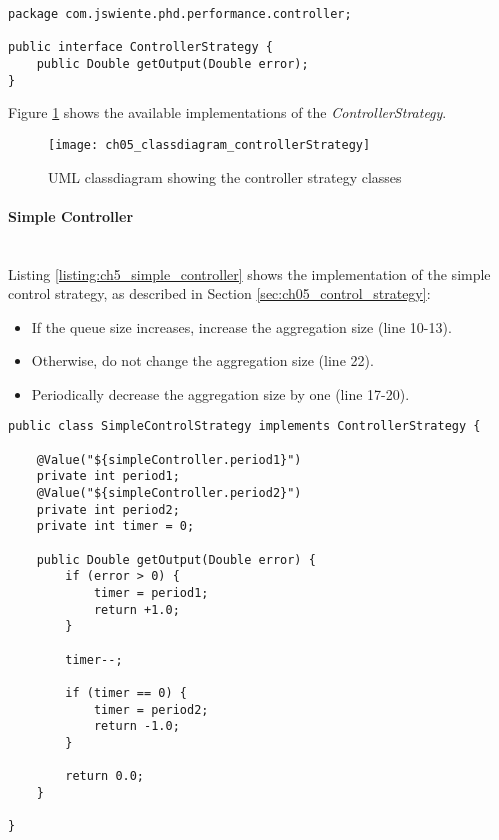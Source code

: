 \begin{lstlisting}[caption={ControllerStrategy Interface},label=listing:ch5_controller_strategy]
package com.jswiente.phd.performance.controller;

public interface ControllerStrategy {
	public Double getOutput(Double error);
}
\end{lstlisting}

Figure \ref{fig:ch05_classdiagram_controllerStrategy} shows the available implementations of the \emph{ControllerStrategy}.

\begin{figure}[htbp]
	\centering
	\texttt{[image: ch05\_classdiagram\_controllerStrategy]}
	\caption{\ac{UML} classdiagram showing the controller strategy classes}
	\label{fig:ch05_classdiagram_controllerStrategy}
\end{figure}

\paragraph{Simple Controller}\mbox{}\\

Listing \ref{listing:ch5_simple_controller} shows the implementation of the simple control strategy, as described in Section \ref{sec:ch05_control_strategy}:
\begin{itemize}
	\item If the queue size increases, increase the aggregation size (line 10-13).
	\item Otherwise, do not change the aggregation size (line 22).
	\item Periodically decrease the aggregation size by one (line 17-20).
\end{itemize}

\begin{lstlisting}[caption={Implementation of the simple control strategy},label=listing:ch5_simple_controller]
public class SimpleControlStrategy implements ControllerStrategy {

	@Value("${simpleController.period1}")
	private int period1;
	@Value("${simpleController.period2}")
	private int period2;
	private int timer = 0;
	
	public Double getOutput(Double error) {
		if (error > 0) {
			timer = period1;
			return +1.0;
		}

		timer--;
		
		if (timer == 0) {
			timer = period2;
			return -1.0;
		}
		
		return 0.0;
	}

}	
\end{lstlisting}


